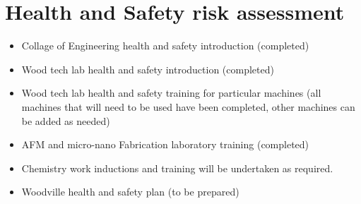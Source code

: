 \section{Health and Safety risk assessment}
\begin{itemize}
\item Collage of Engineering health and safety introduction (completed)
\end{itemize}

\begin{itemize}
\item Wood tech lab health and safety introduction (completed)
\end{itemize}

\begin{itemize}
\item Wood tech lab health and safety training for particular machines (all machines
that will need to be used have been completed, other machines can be added as
needed)
\end{itemize}

\begin{itemize}
\item AFM and micro-nano Fabrication laboratory training (completed)
\end{itemize}

\begin{itemize}
\item Chemistry work inductions and training will be undertaken as required.
\end{itemize}
\begin{itemize}
\item Woodville health and safety plan (to be prepared)
\end{itemize}

  